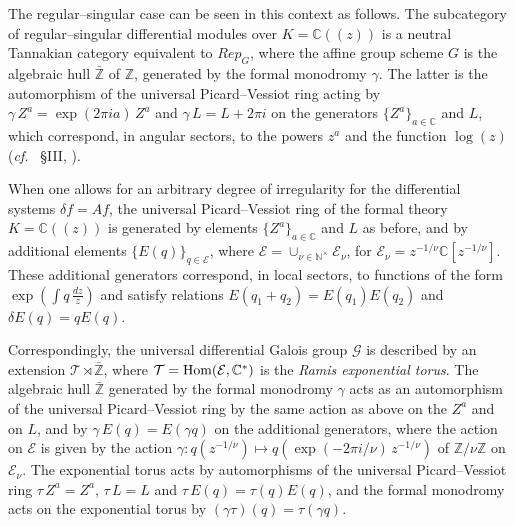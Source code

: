 \documentclass[10pt]{amsart}
\def\C{{\mathbb C}}
\def\N{{\mathbb N}}
\def\Z{{\mathbb Z}}
\def\Ec{{\mathcal E}}
\def\cG{{\mathcal G}}
\def\Hom{\mathop{\rm Hom}\nolimits}
\newcommand{\cf}{{\it cf.\/}\ }
\numberwithin{equation}{section}
\begin{document}
\smallskip

The regular--singular case can be seen in this context as follows.
The subcategory of regular--singular differential modules over
$K=\C((z))$ is a neutral Tannakian category equivalent to $Rep_G$,
where the affine group scheme $G$
is the algebraic hull $\bar\Z$ of $\Z$, generated by the formal monodromy
$\gamma$. The latter is the automorphism of the universal
Picard--Vessiot ring acting by
$\gamma \, Z^a = \exp(2\pi i a)\, Z^a$ and $\gamma\, L = L +
2\pi i$ on the generators
$\{ Z^a \}_{a\in \C}$ and $L$, which correspond, in angular sectors,
to the powers $z^a$ and the function
$\log(z)$ (\cf \cite{vPS} \S III, \cite{vP}).

\smallskip

When one allows for an arbitrary degree of irregularity for the
differential systems $\delta f =Af$, the universal Picard--Vessiot
ring of the formal theory $K=\C((z))$ is generated by elements $\{ Z^a
\}_{a\in \C}$ and $L$ as before, and by additional elements $\{ E(q)
\}_{q\in \Ec}$,
where $\Ec= \cup_{\nu\in \N^\times} \Ec_\nu$, for $\Ec_\nu=
z^{-1/\nu} \C [ z^{-1/\nu} ]$.
These additional generators correspond, in local sectors, to functions of
the form $\exp(\int q\, \frac{dz}{z})$ and satisfy
relations $E(q_1+q_2)=E(q_1)E(q_2)$ and $\delta E(q)=q E(q)$.

\smallskip

Correspondingly, the universal
differential Galois group $\cG$ is described by an extension
${\mathcal T}\rtimes \bar\Z$, where ${\mathcal T}=\Hom(\Ec, \C^*)$ is
the {\em Ramis exponential torus}. The algebraic hull
$\bar\Z$ generated by the formal monodromy $\gamma$ acts
as an automorphism of the universal Picard--Vessiot ring by
the same action as above on the $Z^a$ and on
$L$, and by $\gamma\, E(q) = E(\gamma q)$ on the
additional generators, where the action on $\Ec$ is given by the
 action $ \gamma : q( z^{-1/\nu}) \mapsto q(
 \exp( -2\pi i/\nu) \, z^{-1/\nu})$
of $\Z/\nu\Z$ on $\Ec_\nu$.
The exponential torus acts by automorphisms of the
universal Picard--Vessiot ring $\tau\,Z^a=Z^a$, $\tau\, L=L$ and
$\tau\, E(q)=\tau(q) E(q)$, and the formal monodromy acts on the
exponential torus by $(\gamma\tau)(q)=\tau(\gamma q)$.

\smallskip
\end{document}

